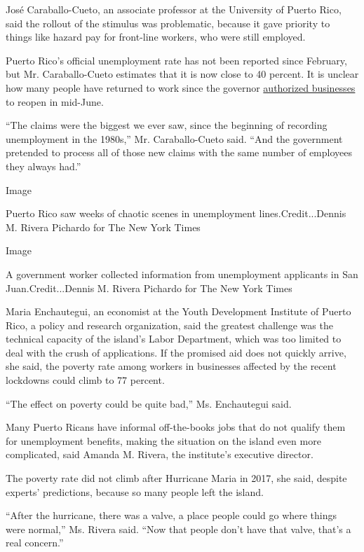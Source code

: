 José Caraballo-Cueto, an associate professor at the University of Puerto
Rico, said the rollout of the stimulus was problematic, because it gave
priority to things like hazard pay for front-line workers, who were
still employed.

Puerto Rico's official unemployment rate has not been reported since
February, but Mr. Caraballo-Cueto estimates that it is now close to 40
percent. It is unclear how many people have returned to work since the
governor
\href{https://www.nytimes3xbfgragh.onion/2020/05/08/travel/travel-reopenings-virus.html}{authorized
businesses} to reopen in mid-June.

``The claims were the biggest we ever saw, since the beginning of
recording unemployment in the 1980s,'' Mr. Caraballo-Cueto said. ``And
the government pretended to process all of those new claims with the
same number of employees they always had.''

Image

Puerto Rico saw weeks of chaotic scenes in unemployment
lines.Credit...Dennis M. Rivera Pichardo for The New York Times

Image

A government worker collected information from unemployment applicants
in San Juan.Credit...Dennis M. Rivera Pichardo for The New York Times

Maria Enchautegui, an economist at the Youth Development Institute of
Puerto Rico, a policy and research organization, said the greatest
challenge was the technical capacity of the island's Labor Department,
which was too limited to deal with the crush of applications. If the
promised aid does not quickly arrive, she said, the poverty rate among
workers in businesses affected by the recent lockdowns could climb to 77
percent.

``The effect on poverty could be quite bad,'' Ms. Enchautegui said.

Many Puerto Ricans have informal off-the-books jobs that do not qualify
them for unemployment benefits, making the situation on the island even
more complicated, said Amanda M. Rivera, the institute's executive
director.

The poverty rate did not climb after Hurricane Maria in 2017, she said,
despite experts' predictions, because so many people left the island.

``After the hurricane, there was a valve, a place people could go where
things were normal,'' Ms. Rivera said. ``Now that people don't have that
valve, that's a real concern.''

